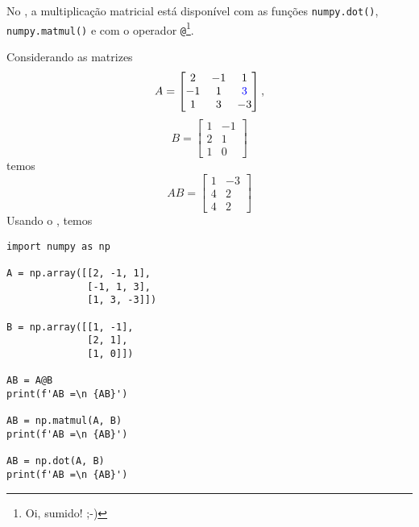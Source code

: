 No {\numpy}, a multiplicação matricial está disponível com as funções \lstinline+numpy.dot()+, \lstinline+numpy.matmul()+ e com o operador \lstinline+@+\footnote{Oi, sumido! ;-)}.

\begin{ex}
  Considerando as matrizes
  \begin{equation}
    A =
    \begin{bmatrix}
      2 & -1 & 1\\
      -1 & 1 & {\color{blue}3}\\
      1 & 3 & -3
    \end{bmatrix},
  \end{equation}
  \begin{equation}
    B =
    \begin{bmatrix}
      1 & -1\\
      2 & 1\\
      1 & 0
    \end{bmatrix}
  \end{equation}
  temos
  \begin{equation}
    AB =
    \begin{bmatrix}
      1 & -3\\
      4 & 2\\
      4 & 2
    \end{bmatrix}
  \end{equation}
  Usando o {\numpy}, temos
\begin{lstlisting}
import numpy as np

A = np.array([[2, -1, 1],
              [-1, 1, 3],
              [1, 3, -3]])

B = np.array([[1, -1],
              [2, 1],
              [1, 0]])

AB = A@B
print(f'AB =\n {AB}')

AB = np.matmul(A, B)
print(f'AB =\n {AB}')

AB = np.dot(A, B)
print(f'AB =\n {AB}')
\end{lstlisting}
\end{ex}

